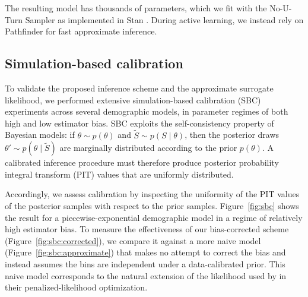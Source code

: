 \documentclass[12pt]{article}
\begin{document}
The resulting model has thousands of parameters, which we fit with the No-U-Turn Sampler \citep{nuts} as implemented in Stan \citep{XXX_stan}. During active learning, we instead rely on Pathfinder \citep{pathfinder} for fast approximate inference.


\subsection{Simulation-based calibration}

To validate the proposed inference scheme and the approximate surrogate likelihood, we performed extensive simulation-based calibration (SBC) experiments \citep{Talts_2020} across several demographic models, in parameter regimes of both high and low estimator bias. SBC exploits the self-consistency property of Bayesian models: if $\theta \sim p(\theta)$ and $\tilde S \sim p(S \mid \theta)$, then the posterior draws $\theta' \sim p(\theta \mid \tilde S)$ are marginally distributed according to the prior $p(\theta)$. A calibrated inference procedure must therefore produce posterior probability integral transform (PIT) values that are uniformly distributed.

Accordingly, we assess calibration by inspecting the uniformity of the PIT values of the posterior samples with respect to the prior samples. Figure~\ref{fig:sbc} shows the result for a piecewise-exponential demographic model in a regime of relatively high estimator bias. To measure the effectiveness of our bias-corrected scheme (Figure~\ref{fig:sbc:corrected}), we compare it against a more naive model (Figure~\ref{fig:sbc:approximate}) that makes no attempt to correct the bias and instead assumes the bins are independent under a data-calibrated prior. This naive model corresponds to the natural extension of the likelihood used by \citet{Fournier_2023} in their penalized-likelihood optimization.
\end{document}
